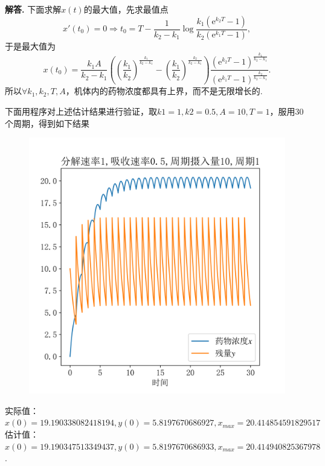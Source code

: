 \documentclass[12pt, a4paper, oneside]{ctexart}
\newenvironment{solution}[1][]{\par\noindent\textbf{#1解答. }}{\smallskip\par}  %
\def\e{\mathrm{e}}          %
\begin{document}
\begin{solution}
    下面求解$x(t)$的最大值，先求最值点
    \begin{equation*}
        x'(t_0) = 0\Rightarrow t_0 = T -\frac{1}{k_2-k_1}\log\frac{k_1(\e^{k_2T}-1)}{k_2(\e^{k_1T}-1)},
    \end{equation*}
    于是最大值为
    \begin{equation*}
        x(t_0) = \frac{k_1A}{k_2-k_1}\left(\left(\frac{k_1}{k_2}\right)^{\frac{k_1}{k_2-k_1}}-\left(\frac{k_1}{k_2}\right)^{\frac{k_2}{k_2-k_1}}\right)\frac{(\e^{k_2T}-1)^{\frac{k_1}{k_2-k_1}}}{(\e^{k_1T}-1)^{\frac{k_2}{k_2-k_1}}}.
    \end{equation*}
    所以$\forall k_1,k_2,T,A$，机体内的药物浓度都具有上界，而不是无限增长的.

    下面用程序对上述估计结果进行验证，取$k1=1,k2=0.5,A=10,T=1$，服用$30$个周期，得到如下结果
    \begin{figure}[htbp]
        \centering
        \includegraphics[scale=0.8]{浓度与残量关于时间变化关系.png}
    \end{figure}

    \par\noindent 实际值：$x(0)=19.190338082418194, y(0)=5.8197670686927, x_{max}=20.414854591829517$\\
    估计值：$x(0)=19.190347513349437, y(0)=5.8197670686933, x_{max}=20.414940825367978$.
\end{solution}
\end{document}
